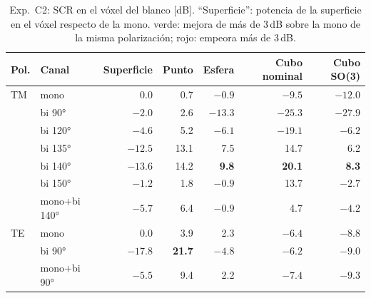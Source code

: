 \begin{table}[H]
\centering\small
\caption{Exp.~C2: SCR en el vóxel del blanco [dB]. ``Superficie'': potencia de la superficie
en el vóxel respecto de la mono. \colorbox{mejor}{verde}: mejora de más de 3\,dB sobre la mono
de la misma polarización; \colorbox{peor}{rojo}: empeora más de 3\,dB.}
\label{tab:C2}
\begin{tabular}{@{}llrrrrr@{}}
\toprule
Pol. & Canal & Superficie & Punto & Esfera & Cubo nominal & Cubo SO(3) \\
\midrule
TM & mono & 0.0 & 0.7 & $-0.9$ & $-9.5$ & $-12.0$ \\
 & bi 90° & $-2.0$ & 2.6 & \cellcolor{peor}$-13.3$ & \cellcolor{peor}$-25.3$ & \cellcolor{peor}$-27.9$ \\
 & bi 120° & $-4.6$ & \cellcolor{mejor}5.2 & \cellcolor{peor}$-6.1$ & \cellcolor{peor}$-19.1$ & \cellcolor{mejor}$-6.2$ \\
 & bi 135° & $-12.5$ & \cellcolor{mejor}13.1 & \cellcolor{mejor}7.5 & \cellcolor{mejor}14.7 & \cellcolor{mejor}6.2 \\
 & bi 140° & $-13.6$ & \cellcolor{mejor}14.2 & \cellcolor{mejor}\textbf{9.8} & \cellcolor{mejor}\textbf{20.1} & \cellcolor{mejor}\textbf{8.3} \\
 & bi 150° & $-1.2$ & 1.8 & $-0.9$ & \cellcolor{mejor}13.7 & \cellcolor{mejor}$-2.7$ \\
 & mono+bi 140° & $-5.7$ & \cellcolor{mejor}6.4 & $-0.9$ & \cellcolor{mejor}4.7 & \cellcolor{mejor}$-4.2$ \\
\midrule
TE & mono & 0.0 & 3.9 & 2.3 & $-6.4$ & $-8.8$ \\
 & bi 90° & $-17.8$ & \cellcolor{mejor}\textbf{21.7} & \cellcolor{peor}$-4.8$ & $-6.2$ & $-9.0$ \\
 & mono+bi 90° & $-5.5$ & \cellcolor{mejor}9.4 & 2.2 & $-7.4$ & $-9.3$ \\
\bottomrule
\end{tabular}
\end{table}


